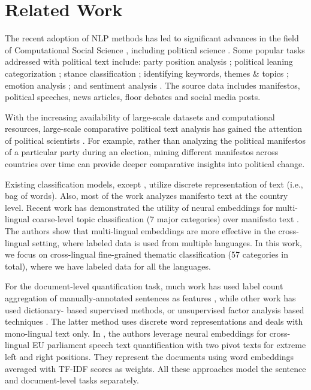 \documentclass[11pt,a4paper]{article}
\begin{document}
\section{Related Work}

The recent adoption of NLP methods has led to significant advances in the field of Computational Social Science \cite{lazer2009life}, including political science \cite{grimmer2013text}. Some popular tasks addressed with political text include: party position analysis \cite{biessmann2016automating};  political leaning categorization \cite{akoglu2014quantifying, zhou2011classifying}; stance classification \cite{sridhar2014collective}; identifying keywords, themes \& topics \cite{karan2016analysis, ding2011keyphrase}; emotion analysis \cite{rheault2016expressions}; and sentiment analysis \cite{bakliwal2013sentiment}. The source data includes manifestos, political speeches, news articles, floor debates and social media posts. 

With the increasing availability of large-scale datasets and computational resources, large-scale comparative political text analysis has gained the attention of political scientists \cite{lucas2015computer}. For example, rather than analyzing the political manifestos of a particular party during an election, mining different manifestos across countries over time can provide deeper comparative insights into political change. 

Existing classification models, except \cite{W17-2906}, utilize discrete representation of text (i.e., bag of words).  Also, most of the work analyzes manifesto text at the country level. Recent work has demonstrated the utility of neural embeddings for multi-lingual coarse-level topic classification (7 major categories) over manifesto text \cite{W17-2906}. The authors show that multi-lingual embeddings are more effective in the cross-lingual setting, where labeled data is used from multiple languages. In this work, we focus on cross-lingual fine-grained thematic classification (57 categories in total), where we have labeled data for all the languages.

For the document-level quantification task, much work has used label count aggregation of  manually-annotated sentences as features \cite{lowe2011scaling, benoit2014putting}, while other work has used dictionary- based supervised methods, or unsupervised factor analysis based techniques \cite{hjorth2015computers, 2017arXiv170704737B}. The latter method uses discrete word representations and deals with mono-lingual text only. In , the authors leverage neural embeddings for cross-lingual EU parliament speech text quantification with two pivot texts for extreme left and right positions. They represent the documents using word embeddings averaged with TF-IDF scores as weights. All these approaches model the sentence and document-level tasks separately.
\end{document}
